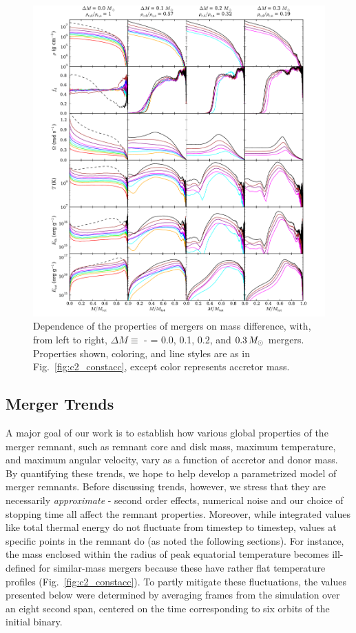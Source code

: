 \begin{figure}
\centering
\includegraphics[angle=0,width=1.0\columnwidth]{chapter2_zhu+13/figures/deltamcomp.pdf}
\caption{Dependence of the properties of mergers on mass difference, with, from left to right, $\Delta M \equiv $ {\Ma} - {\Md} = 0.0, 0.1, 0.2, and $0.3\,\Msun$ mergers.  Properties shown, coloring, and line styles are as in Fig.~\ref{fig:c2_constacc}, except color represents accretor mass.}
\label{fig:c2_deltamcomp}
\end{figure}

\subsection{Merger Trends}
\label{ssec:c2_mergertrends}

A major goal of our work is to establish how various global properties of the merger remnant, such as remnant core and disk mass, maximum temperature, and maximum angular velocity, vary as a function of accretor and donor mass.  By quantifying these trends, we hope to help develop a parametrized model of merger remnants.  Before discussing trends, however, we stress that they are necessarily \textit{approximate} - second order effects, numerical noise and our choice of stopping time all affect the remnant properties.  Moreover, while integrated values like total thermal energy do not fluctuate from timestep to timestep, values at specific points in the remnant do (as noted the following sections).  For instance, the mass enclosed within the radius of peak equatorial temperature becomes ill-defined for similar-mass mergers because these have rather flat temperature profiles (Fig.~\ref{fig:c2_constacc}).  To partly mitigate these fluctuations, the values presented below were determined by averaging frames from the simulation over an eight second span, centered on the time corresponding to six orbits of the initial binary.

